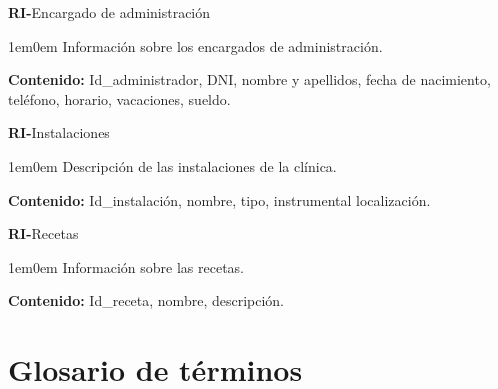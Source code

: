 \documentclass[11pt,a4paper]{article}
\newcounter{RICounter}
\newenvironment{rienv}[1]
	{\addtocounter{RICounter}{1}\textbf{\rmfamily RI-\theRICounter}\quad#1\begin{adjustwidth}{1em}{0em}}
	{\end{adjustwidth}}
\begin{document}
\begin{rienv}{Encargado de administración}
	Información sobre los encargados de administración.

  	\textbf{Contenido:} Id\_administrador, DNI, nombre y apellidos, fecha de nacimiento, teléfono, horario, vacaciones, sueldo.
\end{rienv}
  
\begin{rienv}{Instalaciones}
	Descripción de las instalaciones de la clínica.

  	\textbf{Contenido:} Id\_instalación, nombre, tipo, instrumental localización.
\end{rienv}

\begin{rienv}{Recetas}
	Información sobre las recetas.

  	\textbf{Contenido:} Id\_receta, nombre, descripción.
\end{rienv}
  

\section{Glosario de términos} %
\label{sec:glosario_de_términos}
\end{document}
